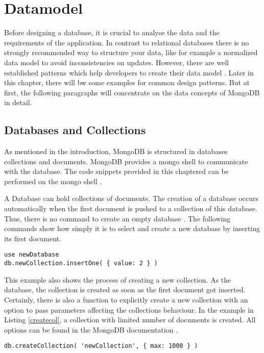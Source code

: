 \section{Datamodel}
Before designing a database, it is crucial to analyse the data and the requirements of the application. In contrast to relational databases there is no strongly recommended way to structure your data, like for example a normalized data model to avoid inconsistencies on updates. However, there are well established patterns which help developers to create their data model \cite{mdbinaction}. Later in this chapter, there will bw some examples for common design patterns. But at first, the following paragraphs will concentrate on the data concepts of MongoDB in detail.

\subsection{Databases and Collections}
As mentioned in the introduction, MongoDB is structured in databases collections and documents. MongoDB provides a mongo shell to communicate with the database. The code snippets provided in this chaptered can be performed on the mongo shell \cite{mdbdocu}.

A Database can hold collections of documents. The creation of a database occurs automatically when the first document is pushed to a collection of this database. Thus, there is no command to create an empty database \cite{mdbdocu}. The following commands show how simply it is to select and create a new database by inserting its first document.

\begin{lstlisting}[frame=single, caption=Create Database, label=createdb]
use newDatabase
db.newCollection.insertOne( { value: 2 } )
\end{lstlisting}


This example also shows the process of creating a new collection. As the database, the collection is created as soon as the first document got inserted. Certainly, there is also a function to explicitly create a new collection with an option to pass parameters affecting the collections behaviour. In the example in Listing \ref{createcol}, a collection with limited number of documents is created. All options can be found in the MongoDB documentation \cite{mdbdocu}.

\begin{lstlisting}[frame=single, caption=Create Collection, label=createcol]
db.createCollection( 'newCollection', { max: 1000 } )
\end{lstlisting}

